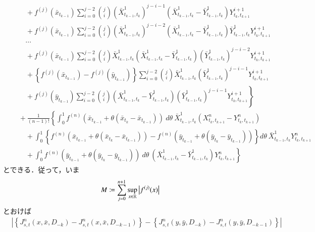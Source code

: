 \begin{prf}
\begin{description}
\begin{align}
							&\qquad + f^{(j)}(\bar{x}_{t_{k-1}}) \sum_{i=0}^{j-2} \binom{j}{i} \left( \bar{X}^1_{t_{k-1},t_k} \right)^{j-i-1} \left( \bar{X}^1_{t_{k-1},t_k} - \bar{Y}^1_{t_{k-1},t_k} \right) Y^{i+1}_{t_k,t_{k+1}} \\
							&\qquad + f^{(j)}(\bar{x}_{t_{k-1}}) \sum_{i=0}^{j-2} \binom{j}{i} \left( \bar{X}^1_{t_{k-1},t_k} \right)^{j-i-2} \left( \bar{X}^1_{t_{k-1},t_k} - \bar{Y}^1_{t_{k-1},t_k} \right) \bar{Y}^1_{t_{k-1},t_k} Y^{i+1}_{t_k,t_{k+1}} \\
							&\qquad \cdots \\
							&\qquad + f^{(j)}(\bar{x}_{t_{k-1}}) \sum_{i=0}^{j-2} \binom{j}{i} \bar{X}^1_{t_{k-1},t_k} \left( \bar{X}^1_{t_{k-1},t_k} - \bar{Y}^1_{t_{k-1},t_k} \right) \left( \bar{Y}^1_{t_{k-1},t_k} \right)^{j-i-2} Y^{i+1}_{t_k,t_{k+1}} \\
							&\qquad + \left\{ f^{(j)}(\bar{x}_{t_{k-1}}) - f^{(j)}(\bar{y}_{t_{k-1}}) \right\} \sum_{i=0}^{j-2} \binom{j}{i} \bar{X}^1_{t_{k-1},t_k} \left( \bar{Y}^1_{t_{k-1},t_k} \right)^{j-i-1} Y^{i+1}_{t_k,t_{k+1}} \\
							&\qquad + \left. f^{(j)}(\bar{y}_{t_{k-1}}) \sum_{i=0}^{j-2} \binom{j}{i} \left( \bar{X}^1_{t_{k-1},t_k} - \bar{Y}^1_{t_{k-1},t_k} \right) \left( \bar{Y}^1_{t_{k-1},t_k} \right)^{j-i-1} Y^{i+1}_{t_k,t_{k+1}} \right\} \\
						&\quad + \frac{1}{(n-1)!} \left\{ \int_0^1 f^{(n)}(\bar{x}_{t_{k-1}} + \theta(\bar{x}_{t_k}-\bar{x}_{t_{k-1}}))\ d\theta\ \bar{X}^1_{t_{k-1},t_k} \left( X^{n}_{t_k,t_{k+1}} - Y^{n}_{t_k,t_{k+1}} \right) \right. \\
							&\qquad + \int_0^1 \left\{ f^{(n)}(\bar{x}_{t_{k-1}} + \theta(\bar{x}_{t_k}-\bar{x}_{t_{k-1}})) - f^{(n)}(\bar{y}_{t_{k-1}} + \theta(\bar{y}_{t_k}-\bar{y}_{t_{k-1}})) \right\} d\theta\ \bar{X}^1_{t_{k-1},t_k} Y^{n}_{t_k,t_{k+1}} \\
							&\qquad + \left. \int_0^1 f^{(n)}(\bar{y}_{t_{k-1}} + \theta(\bar{y}_{t_k}-\bar{y}_{t_{k-1}}))\ d\theta\ \left( \bar{X}^1_{t_{k-1},t_k} - \bar{Y}^1_{t_{k-1},t_k} \right) Y^{n}_{t_k,t_{k+1}} \right\}
				\end{align}
				とできる．従って，いま
				\begin{align}
					M \coloneqq \sum_{j=0}^{n+1}\operatorname*{sup}_{x \in \mathbb{R}} \left| f^{(j)}(x) \right|
				\end{align}
				とおけば
				\begin{align}
					&\left| \left\{J^n_{s,t}(x,\bar{x},D_{-k}) - J^n_{s,t}(x,\bar{x},D_{-k-1})\right\} - \left\{J^n_{s,t}(y,\bar{y},D_{-k}) - J^n_{s,t}(y,\bar{y},D_{-k-1})\right\} \right| \\

\end{align}
\end{description}
\end{prf}
